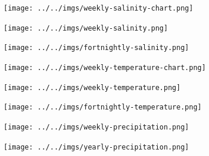 \documentclass[10pt]{article}
\begin{document}
\begin{SidewaysFigure}
\centering
\texttt{[image: ../../imgs/weekly-salinity-chart.png]}
\end{SidewaysFigure}
\vfill
\newpage

\begin{SidewaysFigure}
\centering
\texttt{[image: ../../imgs/weekly-salinity.png]}
\end{SidewaysFigure}
\vfill
\newpage

\begin{SidewaysFigure}
\centering
\texttt{[image: ../../imgs/fortnightly-salinity.png]}
\end{SidewaysFigure}
\vfill
\newpage

\begin{SidewaysFigure}
\centering
\texttt{[image: ../../imgs/weekly-temperature-chart.png]}
\end{SidewaysFigure}
\vfill
\newpage

\begin{SidewaysFigure}
\centering
\texttt{[image: ../../imgs/weekly-temperature.png]}
\end{SidewaysFigure}
\vfill
\newpage

\begin{SidewaysFigure}
\centering
\texttt{[image: ../../imgs/fortnightly-temperature.png]}
\end{SidewaysFigure}
\vfill
\newpage

\begin{SidewaysFigure}
\centering
\texttt{[image: ../../imgs/weekly-precipitation.png]}
\end{SidewaysFigure}
\vfill
\newpage

\begin{SidewaysFigure}
\centering
\texttt{[image: ../../imgs/yearly-precipitation.png]}
\end{SidewaysFigure}
\vfill
\newpage
\end{document}

